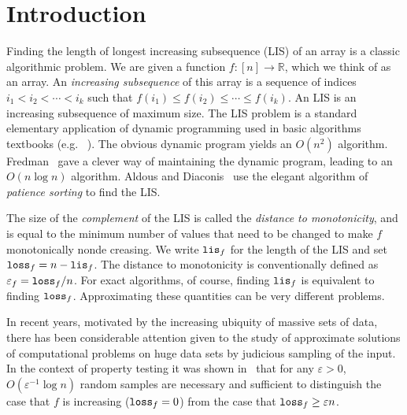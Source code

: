\documentclass{acmsmall}
\newcommand{\lis}{{\tt lis}}
\newcommand{\loss}{{\tt loss}}
\newcommand{\eps}{\varepsilon}
\begin{document}
\maketitle


\section{Introduction}

Finding the length of longest increasing subsequence (LIS) of an array
is a classic algorithmic problem. We are given
a function $f:[n] \rightarrow \mathbb{R}$, which we think of as an array.
An \emph{increasing subsequence} of this array is a sequence
of indices $i_1 < i_2 < \cdots < i_k$ such that 
$f(i_1) \leq f(i_2) \leq \cdots \leq f(i_k)$. An LIS is an 
increasing subsequence
of maximum size. The LIS problem is a standard elementary application
of dynamic programming used in basic algorithms textbooks (e.g. ~\cite{CLRS}).
The obvious dynamic program yields
an $O(n^2)$ algorithm. Fredman~\cite{F75} gave a clever way of maintaining the dynamic program,
leading to an $O(n\log n)$ algorithm.
Aldous and Diaconis~\cite{AD99} use the elegant algorithm of 
\emph{patience sorting} to find
the LIS.  

The size of the \emph{complement} of the LIS is called
the \emph{distance to monotonicity}, and  is equal to the minimum number of values that need to be changed to make
$f$ monotonically nonde
creasing.  We write $\lis_f$ for the length of the LIS
and set $\loss_f=n-\lis_f$. The distance to monotonicity is conventionally defined
as $\eps_f = \loss_f/n$.
For exact algorithms, of course,
finding $\lis_f$ is equivalent to finding $\loss_f$. Approximating these quantities can be 
very different problems.

In recent years, motivated by the increasing ubiquity of massive
sets of data, there has been considerable attention given to
the study of approximate solutions of computational problems on huge
data sets by judicious sampling of the input.
In the context of property testing it was
shown in~\cite{EKK+00,DGLRRS99,FischerSurvey,ACCL1} 
that for any $\eps > 0$,
$O(\eps^{-1}\log n)$ random samples are necessary and sufficient to
distinguish the case that $f$ is increasing ($\loss_f=0$)
from the case that $\loss_f \geq \eps n$. 
\end{document}
